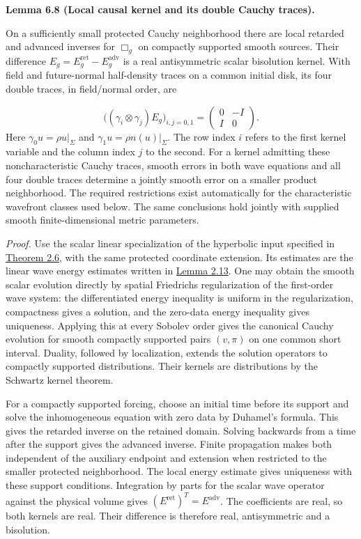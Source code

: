 \documentclass[
  english,
  11pt,
  reqno]{amsart}
\makeatletter
\newcommand{\pandocstatementheading}[1]{%
  \par\addpenalty{\@beginparpenalty}%
  \addvspace{.5\baselineskip plus .2\baselineskip minus .2\baselineskip}%
  {\normalfont\bfseries #1\par}%
  \nobreak\@afterindenttrue\@afterheading
}
\makeatother
\begin{document}
\pandocstatementheading{\leavevmode{}\label{lem:online-local-wave-green}Lemma 6.8 (Local causal kernel and its double Cauchy traces).}

On a sufficiently small protected Cauchy neighborhood there are local
retarded and advanced inverses for \(\Box_g\) on compactly supported
smooth sources. Their difference
\(E_g=E_g^{\mathrm{ret}}-E_g^{\mathrm{adv}}\) is a real antisymmetric
scalar bisolution kernel. With field and future-normal half-density
traces on a common initial disk, its four double traces, in field/normal
order, are

\label{eq:online-causal-kernel-four-traces} \[
\bigl((\gamma_i\otimes\gamma_j)E_g\bigr)_{i,j=0,1}
=\begin{pmatrix}0&-I\\ I&0\end{pmatrix}.
\] Here \(\gamma_0u=\rho u|_\Sigma\) and
\(\gamma_1u=\rho n(u)|_\Sigma\). The row index \(i\) refers to the first
kernel variable and the column index \(j\) to the second. For a kernel
admitting these noncharacteristic Cauchy traces, smooth errors in both
wave equations and all four double traces determine a jointly smooth
error on a smaller product neighborhood. The required restrictions exist
automatically for the characteristic wavefront classes used below. The
same conclusions hold jointly with supplied smooth finite-dimensional
metric parameters.

\emph{Proof.} Use the scalar linear specialization of the hyperbolic
input specified in
\hyperref[thm:online-smooth-local-cauchy-input]{Theorem 2.6}, with the
same protected coordinate extension. Its estimates are the linear wave
energy estimates written in
\hyperref[lem:online-reduced-cauchy-finite-family-estimates]{Lemma
2.13}. One may obtain the smooth scalar evolution directly by spatial
Friedrichs regularization of the first-order wave system: the
differentiated energy inequality is uniform in the regularization,
compactness gives a solution, and the zero-data energy inequality gives
uniqueness. Applying this at every Sobolev order gives the canonical
Cauchy evolution for smooth compactly supported pairs \((v,\pi)\) on one
common short interval. Duality, followed by localization, extends the
solution operators to compactly supported distributions. Their kernels
are distributions by the Schwartz kernel theorem.

For a compactly supported forcing, choose an initial time before its
support and solve the inhomogeneous equation with zero data by Duhamel's
formula. This gives the retarded inverse on the retained domain. Solving
backwards from a time after the support gives the advanced inverse.
Finite propagation makes both independent of the auxiliary endpoint and
extension when restricted to the smaller protected neighborhood. The
local energy estimate gives uniqueness with these support conditions.
Integration by parts for the scalar wave operator against the physical
volume gives \((E^{\mathrm{ret}})^T=E^{\mathrm{adv}}\). The coefficients
are real, so both kernels are real. Their difference is therefore real,
antisymmetric and a bisolution.
\end{document}
